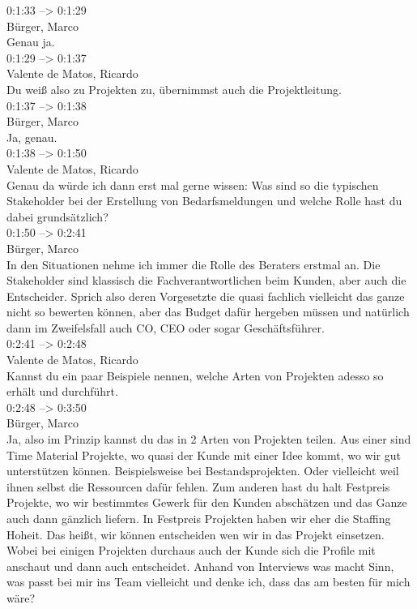 0:1:33 --> 0:1:29\\
Bürger, Marco\\
Genau ja.\\

0:1:29 --> 0:1:37\\
Valente de Matos, Ricardo\\
Du weiß also zu Projekten zu, übernimmst auch die Projektleitung.\\

0:1:37 --> 0:1:38\\
Bürger, Marco\\
Ja, genau.\\

0:1:38 --> 0:1:50\\
Valente de Matos, Ricardo\\
Genau da würde ich dann erst mal gerne wissen: Was sind so die typischen Stakeholder bei der Erstellung von Bedarfsmeldungen und welche Rolle hast du dabei grundsätzlich?\\

0:1:50 --> 0:2:41\\
Bürger, Marco\\
In den Situationen nehme ich immer die Rolle des Beraters erstmal an. Die Stakeholder sind klassisch die Fachverantwortlichen beim Kunden, aber auch die Entscheider. Sprich also deren Vorgesetzte die quasi fachlich vielleicht das ganze nicht so bewerten können, aber das Budget dafür hergeben müssen und natürlich dann im Zweifelsfall auch CO, CEO oder sogar Geschäftsführer.\\

0:2:41 --> 0:2:48\\
Valente de Matos, Ricardo\\
Kannst du ein paar Beispiele nennen, welche Arten von Projekten adesso so erhält und durchführt.\\

0:2:48 --> 0:3:50\\
Bürger, Marco\\
Ja, also im Prinzip kannst du das in 2 Arten von Projekten teilen. Aus einer sind Time Material Projekte, wo quasi der Kunde mit einer Idee kommt, wo wir gut unterstützen können. Beispielsweise bei Bestandsprojekten. Oder vielleicht weil ihnen selbst die Ressourcen dafür fehlen. Zum anderen hast du halt Festpreis Projekte, wo wir bestimmtes Gewerk für den Kunden abschätzen und das Ganze auch dann gänzlich liefern. In Festpreis Projekten haben wir eher die Staffing Hoheit. Das heißt, wir können entscheiden wen wir in das Projekt einsetzen. Wobei bei einigen Projekten durchaus auch der Kunde sich die Profile mit anschaut und dann auch entscheidet. Anhand von Interviews was macht Sinn, was passt bei mir ins Team vielleicht und denke ich, dass das am besten für mich wäre?\\

